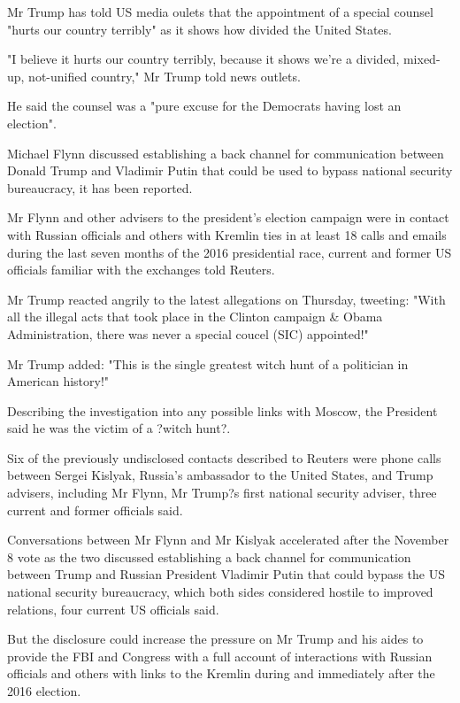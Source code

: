 \documentclass[12pt]{article}
\begin{document}
Mr Trump has told US media oulets that the appointment of a special counsel "hurts our country terribly" as it shows how divided the United States.

"I believe it hurts our country terribly, because it shows we're a divided, mixed-up, not-unified country," Mr Trump told news outlets.

He said the counsel was a "pure excuse for the Democrats having lost an election".

Michael Flynn discussed establishing a back channel for communication between Donald Trump and Vladimir Putin that could be used to bypass national security bureaucracy,  it has been reported.

Mr Flynn and other advisers to the president's election campaign were in contact with Russian officials and others with Kremlin ties in at least 18 calls and emails during the last seven months of the 2016 presidential race, current and former US officials familiar with the exchanges told Reuters.

Mr Trump reacted angrily to the latest allegations on Thursday, tweeting: "With all the illegal acts that took place in the Clinton campaign \& Obama Administration, there was never a special coucel (SIC) appointed!"

Mr Trump added: "This is the single greatest witch hunt of a politician in American history!"

Describing the investigation into any possible links with Moscow, the President said he was the victim of a ?witch hunt?.

Six of the previously undisclosed contacts described to Reuters were phone calls between Sergei Kislyak, Russia's ambassador to the United States, and Trump advisers, including Mr Flynn, Mr Trump?s first national security adviser, three current and former officials said.

Conversations between Mr Flynn and Mr Kislyak accelerated after the November 8 vote as the two discussed establishing a back channel for communication between Trump and Russian President Vladimir Putin that could bypass the US national security bureaucracy, which both sides considered hostile to improved relations, four current US officials said.

But the disclosure could increase the pressure on Mr Trump and his aides to provide the FBI and Congress with a full account of interactions with Russian officials and others with links to the Kremlin during and immediately after the 2016 election. \\
\end{document}
